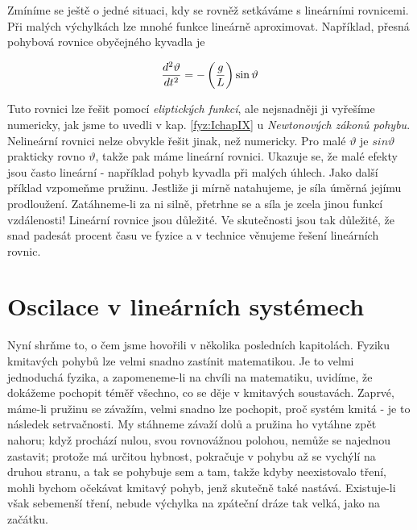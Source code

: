    Zmíníme se ještě o jedné situaci, kdy se rovněž setkáváme s lineárními rovnicemi. Při malých 
    výchylkách lze mnohé funkce lineárně aproximovat. Například, přesná pohybová rovnice obyčejného 
    kyvadla je
    
    \begin{equation}\label{fyz:eq346}
      \dfrac{d^2 \vartheta}{d t^2} = - \left(\dfrac{g}{L}\right)\sin\vartheta
    \end{equation}
    
    Tuto rovnici lze řešit pomocí \emph{eliptických funkcí}, ale nejsnadněji ji vyřešíme numericky, 
    jak jsme to uvedli v kap. \ref{fyz:IchapIX} u \emph{Newtonových zákonů pohybu}. Nelineární 
    rovnici nelze obvykle řešit jinak, než numericky. Pro malé \(\vartheta\) je \(sin\vartheta\) 
    prakticky rovno \(\vartheta\), takže pak máme lineární rovnici. Ukazuje se, že malé efekty jsou 
    často lineární - například pohyb kyvadla při malých úhlech. Jako další příklad vzpomeňme 
    pružinu. Jestliže ji mírně natahujeme, je síla úměrná jejímu prodloužení. Zatáhneme-li za ni 
    silně, přetrhne se a síla je zcela jinou funkcí vzdálenosti! Lineární rovnice jsou důležité. Ve 
    skutečnosti jsou tak důležité, že snad padesát procent času ve fyzice a v technice věnujeme 
    řešení lineárních rovnic.
    
  \section{Oscilace v lineárních systémech}\label{fyz:IchapXXVsecIII}
    Nyní shrňme to, o čem jsme hovořili v několika posledních kapitolách. Fyziku kmitavých pohybů 
    lze velmi snadno zastínit matematikou. Je to velmi jednoduchá fyzika, a zapomeneme-li na chvíli 
    na matematiku, uvidíme, že dokážeme pochopit téměř všechno, co se děje v kmitavých soustavách. 
    Zaprvé, máme-li pružinu se závažím, velmi snadno lze pochopit, proč systém kmitá - je to 
    následek setrvačnosti. My stáhneme závaží dolů a pružina ho vytáhne zpět nahoru; když prochází 
    nulou, svou rovnovážnou polohou, nemůže se najednou zastavit; protože má určitou hybnost, 
    pokračuje v pohybu až se vychýlí na druhou stranu, a tak se pohybuje sem a tam, takže kdyby 
    neexistovalo tření, mohli bychom očekávat kmitavý pohyb, jenž skutečně také nastává. 
    Existuje-li však sebemenší tření, nebude výchylka na zpáteční dráze tak velká, jako na začátku.
    
